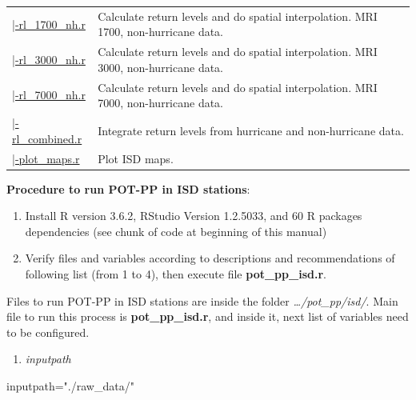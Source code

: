 \documentclass[12pt,twoside]{reedthesis}
\newenvironment{Shaded}{\begin{snugshade}}{\end{snugshade}}
\newcommand{\NormalTok}[1]{#1}
\newcommand{\StringTok}[1]{\textcolor[rgb]{0.31,0.60,0.02}{#1}}
\providecommand{\tightlist}{%
  \setlength{\itemsep}{0pt}\setlength{\parskip}{0pt}}
\begin{document}
\begin{longtable}[t]{>{\raggedright\arraybackslash}p{1.3in}>{\raggedright\arraybackslash}p{4.9in}}
\href{ftp://ftp.geocorp.co/windthesis/code/pot_pp/isd/maps/return_levels_1700_nh.r}{\;\;\;\;\;\;\;\;|-rl\_1700\_nh.r} & Calculate return levels and do spatial interpolation. MRI 1700, non-hurricane data.\\
\href{ftp://ftp.geocorp.co/windthesis/code/pot_pp/isd/maps/return_levels_3000_nh.r}{\;\;\;\;\;\;\;\;|-rl\_3000\_nh.r} & Calculate return levels and do spatial interpolation. MRI 3000, non-hurricane data.\\
\href{ftp://ftp.geocorp.co/windthesis/code/pot_pp/isd/maps/return_levels_7000_nh.r}{\;\;\;\;\;\;\;\;|-rl\_7000\_nh.r} & Calculate return levels and do spatial interpolation. MRI 7000, non-hurricane data.\\
\href{ftp://ftp.geocorp.co/windthesis/code/pot_pp/isd/maps/return_levels_combined.r}{\;\;\;\;\;\;\;\;|-rl\_combined.r} & Integrate return levels from hurricane and non-hurricane data.\\
\href{ftp://ftp.geocorp.co/windthesis/code/pot_pp/isd/maps/plot_maps.r}{\;\;\;\;\;\;\;\;|-plot\_maps.r} & Plot ISD maps.\\
\bottomrule
\end{longtable}
\endgroup{}

\textbf{Procedure to run POT-PP in ISD stations}:
\begin{enumerate}
\def\labelenumi{\arabic{enumi}.}
\item
  Install R version 3.6.2, RStudio Version 1.2.5033, and 60 R packages dependencies (see chunk of code at beginning of this manual)
\item
  Verify files and variables according to descriptions and recommendations of following list (from 1 to 4), then execute file \textbf{pot\_pp\_isd.r}.
\end{enumerate}
Files to run POT-PP in ISD stations are inside the folder \emph{\ldots/pot\_pp/isd/}. Main file to run this process is \textbf{pot\_pp\_isd.r}, and inside it, next list of variables need to be configured.
\begin{enumerate}
\def\labelenumi{\arabic{enumi}.}
\tightlist
\item
  \emph{inputpath}
\end{enumerate}
\scriptsize

\vspace{0.4cm}
\begin{Shaded}
\begin{Highlighting}[]
\NormalTok{      inputpath=}\StringTok{"./raw_data/"}
\end{Highlighting}
\end{Shaded}
\normalsize
\end{document}
